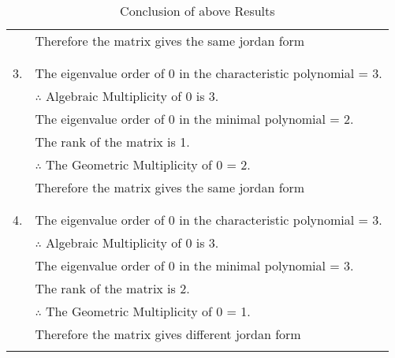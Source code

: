 \documentclass[journal,12pt]{IEEEtran}
\begin{document}
\begin{longtable}{|c|l|}
    &Therefore the matrix gives the same jordan form\\
	& \\
	\hline
	&\\
	3.&The eigenvalue order of 0 in the characteristic polynomial = 3.\\
	&$\therefore$ Algebraic Multiplicity of 0 is 3.\\
	&The eigenvalue order of 0 in the minimal polynomial = 2.\\
    &The rank of the matrix is 1.\\
    &$\therefore$ The Geometric Multiplicity of 0 = 2.\\
    &Therefore the matrix gives the same jordan form\\
	& \\
	\hline
	&\\
	4.&The eigenvalue order of 0 in the characteristic polynomial = 3.\\
	&$\therefore$ Algebraic Multiplicity of 0 is 3.\\
	&The eigenvalue order of 0 in the minimal polynomial = 3.\\
    &The rank of the matrix is 2.\\
    &$\therefore$ The Geometric Multiplicity of 0 = 1.\\
    &Therefore the matrix gives different jordan form\\
	\hline
	\caption{Conclusion of above Results}
    \label{table:3}
\end{longtable}
\end{document}
